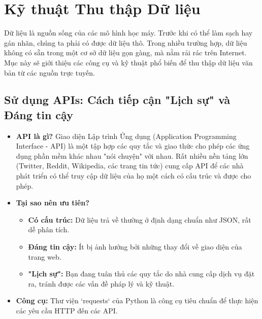 
\section{Kỹ thuật Thu thập Dữ liệu}
\label{sec:data_collection}

Dữ liệu là nguồn sống của các mô hình học máy. Trước khi có thể làm sạch hay gán nhãn, chúng ta phải có được dữ liệu thô. Trong nhiều trường hợp, dữ liệu không có sẵn trong một cơ sở dữ liệu gọn gàng, mà nằm rải rác trên Internet. Mục này sẽ giới thiệu các công cụ và kỹ thuật phổ biến để thu thập dữ liệu văn bản từ các nguồn trực tuyến.

\subsection{Sử dụng APIs: Cách tiếp cận "Lịch sự" và Đáng tin cậy}
\label{ssec:apis}
\begin{itemize}
    \item \textbf{API là gì?} Giao diện Lập trình Ứng dụng (Application Programming Interface - API) là một tập hợp các quy tắc và giao thức cho phép các ứng dụng phần mềm khác nhau "nói chuyện" với nhau. Rất nhiều nền tảng lớn (Twitter, Reddit, Wikipedia, các trang tin tức) cung cấp API để các nhà phát triển có thể truy cập dữ liệu của họ một cách có cấu trúc và được cho phép.
    \item \textbf{Tại sao nên ưu tiên?}
        \begin{itemize}
            \item \textbf{Có cấu trúc:} Dữ liệu trả về thường ở định dạng chuẩn như JSON, rất dễ phân tích.
            \item \textbf{Đáng tin cậy:} Ít bị ảnh hưởng bởi những thay đổi về giao diện của trang web.
            \item \textbf{"Lịch sự":} Bạn đang tuân thủ các quy tắc do nhà cung cấp dịch vụ đặt ra, tránh được các vấn đề pháp lý và kỹ thuật.
        \end{itemize}
    \item \textbf{Công cụ:} Thư viện `requests` của Python là công cụ tiêu chuẩn để thực hiện các yêu cầu HTTP đến các API.
\end{itemize}

